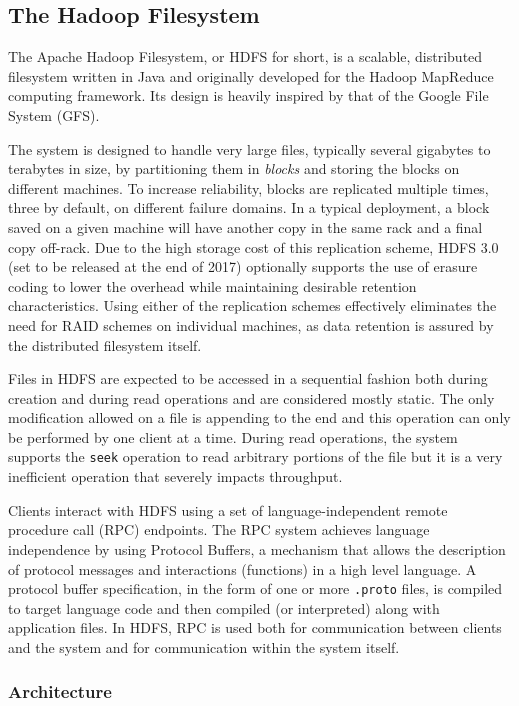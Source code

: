 
\subsection{The Hadoop Filesystem}
The Apache Hadoop Filesystem, or HDFS for short, is a scalable, distributed filesystem written in Java and originally developed for the Hadoop MapReduce computing framework.
Its design is heavily inspired by that of the Google File System \cite{ghemawat2003google} (GFS).

The system is designed to handle very large files, typically several gigabytes to terabytes in size, by partitioning them in \emph{blocks} and storing the blocks on different machines.
To increase reliability, blocks are replicated multiple times, three by default, on different failure domains.
In a typical deployment, a block saved on a given machine will have another copy in the same rack and a final copy off-rack.
Due to the high storage cost of this replication scheme, HDFS 3.0 (set to be released at the end of 2017) optionally supports the use of erasure coding to lower the overhead while maintaining desirable retention characteristics.
Using either of the replication schemes effectively eliminates the need for RAID schemes on individual machines, as data retention is assured by the distributed filesystem itself.

Files in HDFS are expected to be accessed in a sequential fashion both during creation and during read operations and are considered mostly static.
The only modification allowed on a file is appending to the end and this operation can only be performed by one client at a time.
During read operations, the system supports the \texttt{seek} operation to read arbitrary portions of the file but it is a very inefficient operation that severely impacts throughput.

Clients interact with HDFS using a set of language-independent remote procedure call (RPC) endpoints.
The RPC system achieves language independence by using Protocol Buffers, a mechanism that allows the description of protocol messages and interactions (functions) in a high level language.
A protocol buffer specification, in the form of one or more \texttt{.proto} files, is compiled to target language code and then compiled (or interpreted) along with application files.
In HDFS, RPC is used both for communication between clients and the system and for communication within the system itself.

\subsubsection{Architecture}

